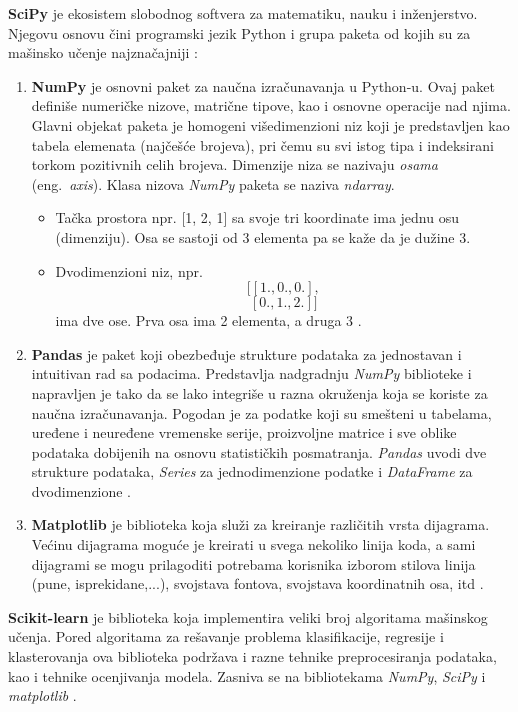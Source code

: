 \documentclass[12pt,oneside]{memoir}
\begin{document}
\textbf{SciPy} je ekosistem slobodnog softvera za matematiku, nauku i inženjerstvo. Njegovu osnovu čini programski jezik Python i grupa paketa od kojih su za mašinsko učenje najznačajniji \cite{scipy}:
\begin{enumerate}[1)]
\item \textbf{NumPy} je osnovni paket za naučna izračunavanja u Python-u. Ovaj paket definiše numeričke nizove, matrične tipove, kao i osnovne operacije nad njima.  %
Glavni objekat paketa je homogeni višedimenzioni niz koji je predstavljen kao tabela elemenata (najčešće brojeva), pri čemu su svi istog tipa i indeksirani torkom pozitivnih celih brojeva. Dimenzije niza se nazivaju \textit{osama} (eng.~\textit{axis}). Klasa nizova \textit{NumPy} paketa se naziva \textit{ndarray}.
\begin{itemize}
\item Tačka prostora npr. [1, 2, 1] sa svoje tri koordinate ima jednu osu (dimenziju). Osa se sastoji od 3 elementa pa se kaže da je dužine 3. 
\item Dvodimenzioni niz, npr.
$$[[ 1., 0., 0.],$$ 
$$ [ 0., 1., 2.]] $$
 ima dve ose. Prva osa ima 2 elementa, a druga 3 \cite{scipy, scipy-quickstart}. 
\end{itemize}
\item \textbf{Pandas}  %
je paket koji obezbeđuje strukture podataka za jednostavan i intuitivan rad sa podacima. Predstavlja nadgradnju \textit{NumPy} biblioteke i napravljen je tako da se lako integriše u razna okruženja koja se koriste za naučna izračunavanja. Pogodan je za podatke koji su smešteni u tabelama, uređene i neuređene vremenske serije, proizvoljne matrice i sve oblike podataka dobijenih na osnovu statističkih posmatranja. \textit{Pandas} uvodi dve strukture podataka, \textit{Series} za jednodimenzione podatke i \textit{DataFrame} za dvodimenzione \cite{pandas}. 
\item \textbf{Matplotlib}  %
je biblioteka koja služi za kreiranje različitih vrsta dijagrama. Većinu dijagrama moguće je kreirati u svega nekoliko linija koda, a sami dijagrami se mogu prilagoditi potrebama korisnika izborom stilova linija (pune, isprekidane,...), svojstava fontova, svojstava koordinatnih osa, itd \cite{matplotlib}.
\end{enumerate}

\textbf{Scikit-learn}  %
je biblioteka koja implementira veliki broj algoritama mašinskog učenja. Pored algoritama za rešavanje problema klasifikacije, regresije i klasterovanja ova biblioteka podržava i razne tehnike preprocesiranja podataka, kao i tehnike ocenjivanja modela. Zasniva se na bibliotekama \textit{NumPy}, \textit{SciPy} i \textit{matplotlib} \cite{scikit-learn}.
\end{document}
